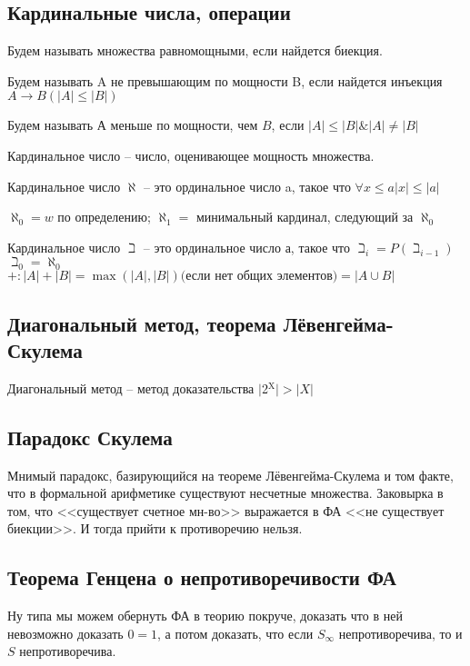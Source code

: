 \subsection{Кардинальные числа, операции}
\label{sec-2-42}
\begin{definition}
    Будем называть множества равномощными, если найдется биекция.
\end{definition}
\begin{definition}
    Будем называть A не превышающим по мощности B, если найдется
    инъекция $A \to B (|A| \le |B|)$
\end{definition}
\begin{definition}
    Будем называть $А$ меньше по мощности, чем $B$, если $|A| \le |B| \& |A| \ne  |B|$
\end{definition}
\begin{definition}
    Кардинальное число -- число, оценивающее мощность множества.
\end{definition}
\begin{definition}
    Кардинальное число $\aleph$ -- это ординальное число a, такое что
    $\forall x \leq a \vert x \vert \leq \vert a \vert$

    $\aleph_0 = w$ по определению; $\aleph_1 = {}$ минимальный кардинал, следующий за $\aleph_0$
\end{definition}
\begin{definition}
    Кардинальное число $\beth$ -- это ординальное число а, такое что
    $\beth_i = P(\beth_{i-1})$\\
    $\beth_0 = \aleph_0$\\
    $+: |A| + |B| = \max(|A|, |B|) \text{(если нет общих элементов)} = |A \cup B|$
\end{definition}
\subsection{Диагональный метод, теорема Лёвенгейма-Скулема}
\label{sec-2-43}
Диагональный метод -- метод доказательства $\vert$2$^{\text{X}}\vert > \vert X \vert$
\subsection{Парадокс Скулема}
\label{sec-2-44}
Мнимый парадокс, базирующийся на теореме Лёвенгейма-Скулема
и том факте, что в формальной арифметике существуют несчетные
множества. Заковырка в том, что <<существует счетное мн-во>> выражается
в ФА <<не существует биекции>>. И тогда прийти к противоречию
нельзя.
\subsection{Теорема Генцена о непротиворечивости ФА}
\label{sec-2-45}
Ну типа мы можем обернуть ФА в теорию покруче, доказать что в ней
невозможно доказать $0=1$, а потом доказать, что если $S_\infty$ непротиворечива,
то и $S$ непротиворечива.
